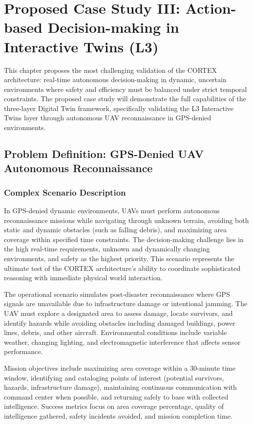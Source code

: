 
\chapter{Proposed Case Study III: Action-based Decision-making in Interactive Twins (L3)} \label{chp:uav}

This chapter proposes the most challenging validation of the CORTEX architecture: real-time autonomous decision-making in dynamic, uncertain environments where safety and efficiency must be balanced under strict temporal constraints. The proposed case study will demonstrate the full capabilities of the three-layer Digital Twin framework, specifically validating the L3 Interactive Twins layer through autonomous UAV reconnaissance in GPS-denied environments.

\section{Problem Definition: GPS-Denied UAV Autonomous Reconnaissance}

\subsection{Complex Scenario Description}

In GPS-denied dynamic environments, UAVs must perform autonomous reconnaissance missions while navigating through unknown terrain, avoiding both static and dynamic obstacles (such as falling debris), and maximizing area coverage within specified time constraints. The decision-making challenge lies in the high real-time requirements, unknown and dynamically changing environments, and safety as the highest priority. This scenario represents the ultimate test of the CORTEX architecture's ability to coordinate sophisticated reasoning with immediate physical world interaction.

The operational scenario simulates post-disaster reconnaissance where GPS signals are unavailable due to infrastructure damage or intentional jamming. The UAV must explore a designated area to assess damage, locate survivors, and identify hazards while avoiding obstacles including damaged buildings, power lines, debris, and other aircraft. Environmental conditions include variable weather, changing lighting, and electromagnetic interference that affects sensor performance.

Mission objectives include maximizing area coverage within a 30-minute time window, identifying and cataloging points of interest (potential survivors, hazards, infrastructure damage), maintaining continuous communication with command center when possible, and returning safely to base with collected intelligence. Success metrics focus on area coverage percentage, quality of intelligence gathered, safety incidents avoided, and mission completion time.

